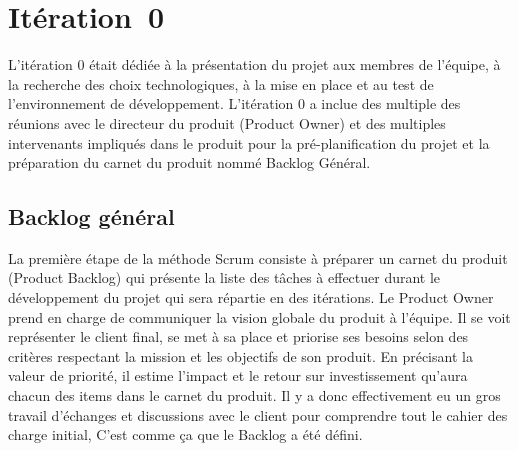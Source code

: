 \chapter{Itération~0}
\label{sec:sprint0}


L'itération 0 était dédiée à la présentation du projet aux membres de l'équipe,
à la recherche des choix technologiques, à la mise en place et au test de
l'environnement de développement. L'itération 0 a inclue des multiple des
réunions avec le directeur du produit (Product Owner) et des multiples
intervenants impliqués dans le produit pour la pré-planification du projet et
la préparation du carnet du produit nommé Backlog Général.


\section{Backlog général}

La première étape de la méthode Scrum consiste à préparer un carnet du produit
(Product Backlog) qui présente la liste des tâches à effectuer durant le
développement du projet qui sera répartie en des itérations. Le Product Owner
prend en charge de communiquer la vision globale du produit à l'équipe. Il se
voit représenter le client final, se met à sa place et priorise ses besoins
selon des critères respectant la mission et les objectifs de son produit. En
précisant la valeur de priorité, il estime l'impact et le retour sur
investissement qu'aura chacun des items dans le carnet du produit. Il y a donc
effectivement eu un gros travail d'échanges et discussions avec le client pour
comprendre tout le cahier des charge initial, C'est comme ça que le Backlog a
été défini.

